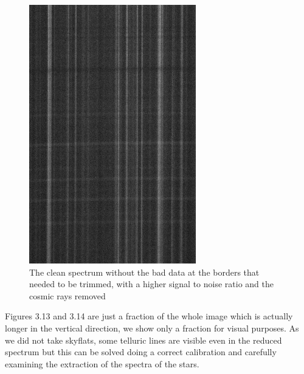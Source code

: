 \begin{figure}[]
\begin{minipage}[b]{0.49\textwidth}
    \includegraphics[width=\textwidth]{images/cluster_clean.png}
    \caption[Clean spectrum of NGC5139]{The clean spectrum without the bad data at the borders that needed to be trimmed, with a higher signal to noise ratio and the cosmic rays removed}
  \end{minipage}
\end{figure}

Figures 3.13 and 3.14 are just a fraction of the whole image which is actually longer in the vertical direction, we show only a fraction for visual purposes. As we did not take skyflats, some telluric lines are visible even in the reduced spectrum but this can be solved doing a correct calibration and carefully examining the extraction of the spectra of the stars.

